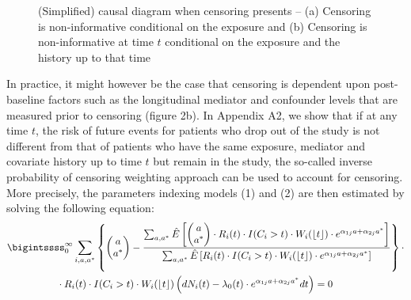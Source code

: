 \documentclass[AMA,STIX1COL]{WileyNJD-v2}
\begin{document}
\begin{figure}
\begin{center}
{}
\end{center}
\caption{(Simplified) causal diagram when censoring presents -- (a) Censoring is non-informative conditional on the exposure and (b) Censoring is non-informative at time $t$ conditional on the exposure and the history up to that time}
\end{figure}
In practice, it might however be the case that censoring is dependent upon post-baseline factors such as the longitudinal mediator and confounder levels that are measured prior to censoring (figure 2b). In Appendix A2, we show that if at any time $t$, the risk of future events for patients who drop out of the study is not different from that of patients who have the same exposure, mediator and covariate history up to time $t$ but remain in the study, the so-called inverse probability of censoring weighting approach can be used to account for censoring. More precisely, the parameters indexing models (1) and (2) are then estimated by solving the following equation:
 \begin{align*}
&\bigintssss_0^\infty \sum_{i, a, a^*}\left\{\begin{pmatrix} a \\ a^* \end{pmatrix} - \frac{\sum_{a,a^*}\hat E\left[\begin{pmatrix} a \\ a^* \end{pmatrix}\cdot R_i(t)\cdot I(C_i>t)\cdot W_i(\lfloor t \rfloor )\cdot e^{\alpha_{1j}a + \alpha_{2j}a^*}\right]}
{\sum_{a,a^*} \hat E\left[R_i(t)\cdot I(C_i>t)\cdot W_i(\lfloor t \rfloor )\cdot e^{\alpha_{1j}a + \alpha_{2j}a^*}\right]}\right\}\cdot \\
&\,\,\,\,\,\,\,\,\,\,\,\,\,\,\,\,\,\,\,\,\,\,\,\,\,\,\,\,\,\,\cdot R_i(t)\cdot I(C_i>t)\cdot W_i(\lfloor t \rfloor )\left(dN_i(t) - \lambda_0(t)\cdot e^{\alpha_{1j}a + \alpha_{2j}a^*}dt\right) = 0
\end{align*}
\end{document}
